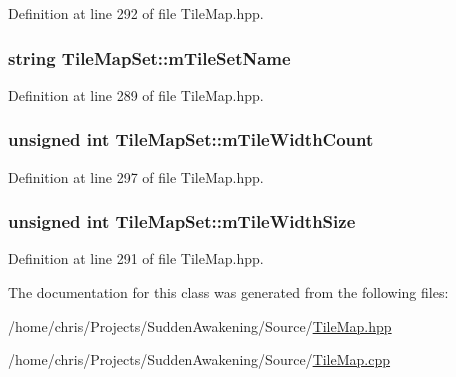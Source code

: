 Definition at line 292 of file Tile\-Map.\-hpp.

\hypertarget{class_tile_map_set_a355b36e8f407752bd128b2a7d8babbba}{
\subsubsection[{m\-Tile\-Set\-Name}]{\setlength{\rightskip}{0pt plus 5cm}string Tile\-Map\-Set\-::m\-Tile\-Set\-Name\hspace{0.3cm}{\ttfamily [protected]}}}\label{class_tile_map_set_a355b36e8f407752bd128b2a7d8babbba}


Definition at line 289 of file Tile\-Map.\-hpp.

\hypertarget{class_tile_map_set_a53e0c59bfbd6285e0b0ca8f79a4af02c}{
\subsubsection[{m\-Tile\-Width\-Count}]{\setlength{\rightskip}{0pt plus 5cm}unsigned int Tile\-Map\-Set\-::m\-Tile\-Width\-Count\hspace{0.3cm}{\ttfamily [protected]}}}\label{class_tile_map_set_a53e0c59bfbd6285e0b0ca8f79a4af02c}


Definition at line 297 of file Tile\-Map.\-hpp.

\hypertarget{class_tile_map_set_ad1dee478b0dd00ff72a6635fd068b8cb}{
\subsubsection[{m\-Tile\-Width\-Size}]{\setlength{\rightskip}{0pt plus 5cm}unsigned int Tile\-Map\-Set\-::m\-Tile\-Width\-Size\hspace{0.3cm}{\ttfamily [protected]}}}\label{class_tile_map_set_ad1dee478b0dd00ff72a6635fd068b8cb}


Definition at line 291 of file Tile\-Map.\-hpp.



The documentation for this class was generated from the following files\-:\begin{DoxyCompactItemize}
\item 
/home/chris/\-Projects/\-Sudden\-Awakening/\-Source/\hyperlink{_tile_map_8hpp}{Tile\-Map.\-hpp}\item 
/home/chris/\-Projects/\-Sudden\-Awakening/\-Source/\hyperlink{_tile_map_8cpp}{Tile\-Map.\-cpp}\end{DoxyCompactItemize}
